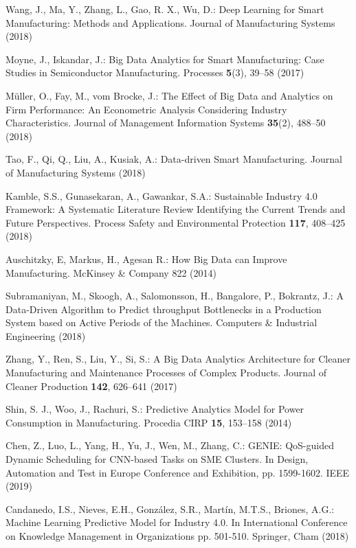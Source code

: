 \documentclass[runningheads]{llncs}
\begin{document}
\begin{thebibliography}{8}
Wang, J., Ma, Y., Zhang, L., Gao, R. X., Wu, D.: Deep Learning for Smart Manufacturing: Methods and Applications. Journal of Manufacturing Systems (2018)

Moyne, J., Iskandar, J.: Big Data Analytics for Smart Manufacturing: Case Studies in Semiconductor Manufacturing. Processes \textbf{5}(3), 39--58 (2017)

M\"uller, O., Fay, M., vom Brocke, J.: The Effect of Big Data and Analytics on Firm Performance: An Econometric Analysis Considering Industry Characteristics. Journal of Management Information Systems \textbf{35}(2), 488--50 (2018)

Tao, F., Qi, Q., Liu, A., Kusiak, A.: Data-driven Smart Manufacturing. Journal of Manufacturing Systems (2018)

Kamble, S.S., Gunasekaran, A., Gawankar, S.A.: Sustainable Industry 4.0 Framework: A Systematic Literature Review Identifying the Current Trends and Future Perspectives. Process Safety and Environmental Protection \textbf{117}, 408--425 (2018) 

Auschitzky, E, Markus, H., Agesan R.: How Big Data can Improve Manufacturing. McKinsey \& Company 822 (2014)

Subramaniyan, M., Skoogh, A., Salomonsson, H., Bangalore, P., Bokrantz, J.: A Data-Driven Algorithm to Predict throughput Bottlenecks in a Production System based on Active Periods of the Machines. Computers \& Industrial Engineering (2018)

Zhang, Y., Ren, S., Liu, Y., Si, S.: A Big Data Analytics Architecture for Cleaner Manufacturing and Maintenance Processes of Complex Products. Journal of Cleaner Production \textbf{142}, 626--641 (2017) 

Shin, S. J., Woo, J., Rachuri, S.: Predictive Analytics Model for Power Consumption in Manufacturing. Procedia CIRP \textbf{15}, 153--158 (2014)

 Chen, Z., Luo, L., Yang, H., Yu, J., Wen, M., Zhang, C.:  GENIE: QoS-guided Dynamic Scheduling for CNN-based Tasks on SME Clusters. In Design, Automation and Test in Europe Conference and Exhibition, pp. 1599-1602. IEEE (2019)

 Candanedo, I.S., Nieves, E.H., González, S.R., Martín, M.T.S., Briones, A.G.: Machine Learning Predictive Model for Industry 4.0. In International Conference on Knowledge Management in Organizations pp. 501-510. Springer, Cham (2018)


\end{thebibliography}
\end{document}
